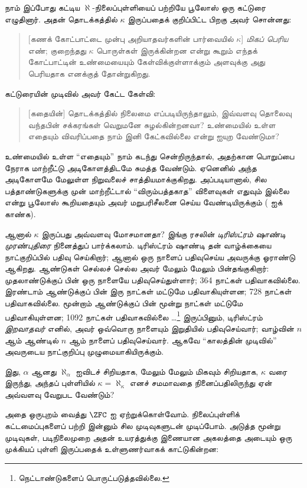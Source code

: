 \documentclass[../../../include/open-logic-section]{subfiles}
\begin{document}
நாம் இப்போது கட்டிய $\aleph$-நிலைப்புள்ளியைப் பற்றியே
பூலோஸ் ஒரு கட்டுரை எழுதினார். அதன் தொடக்கத்தில் $\kappa$
இருப்பதைக் குறிப்பிட்ட பிறகு அவர் சொன்னது:
\begin{quote}
	[கணக் கோட்பாட்டை முன்பு அறியாதவர்களின் பார்வையில் $\kappa$]
	\emph{மிகப் பெரிய} எண்; குறைந்தது $\kappa$ பொருள்கள்
	இருக்கின்றன என்று கூறும் எந்தக் கோட்பாட்டின் உண்மையையும்
	கேள்விக்குள்ளாக்கும் அளவுக்கு அது பெரியதாக எனக்குத் தோன்றுகிறது.
	\citep[p.~257]{Boolos2000}
\end{quote}
கட்டுரையின் முடிவில் அவர் கேட்ட கேள்வி:
\begin{quote}
	[கதையின்] தொடக்கத்தில் நிலைமை எப்படியிருந்தாலும்,
	இவ்வளவு தொலைவு வந்தபின் சக்கரங்கள் வெறுமனே சுழல்கின்றனவா?
	உண்மையில் உள்ள எதையும் விவரிப்பதை நாம் இனி கேட்கவில்லை
	என்று ஐயுற வேண்டுமா?
	\citep[p.~268]{Boolos2000}
\end{quote}
உண்மையில் உள்ள ``எதையும்'' நாம் கடந்து சென்றிருந்தால்,
அதற்கான பொறுப்பை நேராக மாற்றீட்டு அடிகோளத்திடமே சுமத்த
வேண்டும். ஏனெனில் அந்த அடிகோளமே மேலுள்ள நிறுவலைச்
சாத்தியமாக்குகிறது. அப்படியானால், சில பத்தாண்டுகளுக்கு முன்
மாற்றீட்டால் ``விரும்பத்தகாத'' விளைவுகள் எதுவும் இல்லை என்று
பூலோஸ் கூறியதையும் அவர் மறுபரிசீலனை செய்ய வேண்டியிருக்கும்
( ஐக் காண்க).

ஆனால் $\kappa$ இருப்பது அவ்வளவு மோசமானதா? இங்கு ரசலின்
\emph{டிரிஸ்ட்ரம் ஷாண்டி முரண்புதிரை} நினைத்துப் பார்க்கலாம்.
டிரிஸ்ட்ரம் ஷாண்டி தன் வாழ்க்கையை நாட்குறிப்பில் பதிவு செய்கிறார்;
ஆனால் ஒரு நாளைப் பதிவுசெய்ய அவருக்கு ஓராண்டு ஆகிறது.
ஆண்டுகள் செல்லச் செல்ல அவர் மேலும் மேலும் பின்தங்குகிறார்:
முதலாண்டுக்குப் பின் ஒரு நாளையே பதிவுசெய்துள்ளார்; 364 நாட்கள்
பதிவாகவில்லை. இரண்டாம் ஆண்டுக்குப் பின் இரு நாட்கள் மட்டுமே
பதிவாகியுள்ளன; 728 நாட்கள் பதிவாகவில்லை. மூன்றாம் ஆண்டுக்குப்
பின் மூன்று நாட்கள் மட்டுமே பதிவாகியுள்ளன; 1092 நாட்கள்
பதிவாகவில்லை \dots\footnote{நெட்டாண்டுகளைப் பொருட்படுத்தவில்லை.}
இருப்பினும், டிரிஸ்ட்ரம் \emph{இறவாதவர்} எனில், அவர் ஒவ்வொரு
நாளையும் இறுதியில் பதிவுசெய்வார்; வாழ்வின் $n$ ஆம் ஆண்டில்
$n$ ஆம் நாளைப் பதிவுசெய்வார். ஆகவே ``காலத்தின் முடிவில்''
அவருடைய நாட்குறிப்பு முழுமையாகியிருக்கும்.

இது, $\alpha$ ஆனது $\aleph_\alpha$ ஐவிடச் சிறியதாக,
மேலும் மேலும் மிகவும் சிறியதாக, $\kappa$ வரை இருந்து,
அந்தப் புள்ளியில் $\kappa = \aleph_\kappa$ எனச் சமமாவதை
நினைப்பதிலிருந்து ஏன் அவ்வளவு வேறுபட வேண்டும்?

அதை ஒருபுறம் வைத்து $\ZFC$ ஐ ஏற்றுக்கொள்வோம். நிலைப்புள்ளிக்
கட்டமைப்புகளைப் பற்றி இன்னும் சில முடிவுகளுடன் முடிப்போம்.
அடுத்த மூன்று முடிவுகள், படிநிலைமுறை அதன் உயரத்துக்கு
இணையான அகலத்தை அடையும் ஒரு முக்கியப் புள்ளி இருப்பதைக்
உள்ளுணர்வாகக் காட்டுகின்றன:
\end{document}
